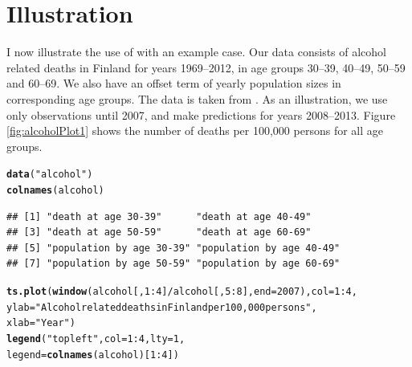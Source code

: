 \documentclass[nojss,article]{jss}\usepackage[]{graphicx}\usepackage[]{color}
\makeatletter
\newcommand{\hlnum}[1]{\textcolor[rgb]{0.686,0.059,0.569}{#1}}%
\newcommand{\hlstr}[1]{\textcolor[rgb]{0.192,0.494,0.8}{#1}}%
\newcommand{\hlopt}[1]{\textcolor[rgb]{0,0,0}{#1}}%
\newcommand{\hlstd}[1]{\textcolor[rgb]{0.345,0.345,0.345}{#1}}%
\newcommand{\hlkwc}[1]{\textcolor[rgb]{0.333,0.667,0.333}{#1}}%
\newcommand{\hlkwd}[1]{\textcolor[rgb]{0.737,0.353,0.396}{\textbf{#1}}}%
\newenvironment{kframe}{%
 \def\at@end@of@kframe{}%
 \ifinner\ifhmode%
  \def\at@end@of@kframe{\end{minipage}}%
  \begin{minipage}{\columnwidth}%
 \fi\fi%
 \def\FrameCommand##1{\hskip\@totalleftmargin \hskip-\fboxsep
 \colorbox{shadecolor}{##1}\hskip-\fboxsep
     \hskip-\linewidth \hskip-\@totalleftmargin \hskip\columnwidth}%
 \MakeFramed {\advance\hsize-\width
   \@totalleftmargin\z@ \linewidth\hsize
   \@setminipage}}%
 {\par\unskip\endMakeFramed%
 \at@end@of@kframe}
\newenvironment{knitrout}{}{} %
\makeatother
\begin{document}
\section{Illustration}\label{illustration}

I now illustrate the use of  with an example case. Our data consists of alcohol related deaths in Finland for years 1969--2012, in age groups 30--39, 40--49, 50--59 and 60--69. We also have an offset term of yearly population sizes in corresponding age groups. The data is taken from \citet{stat1, stat2}. As an illustration, we use only observations until 2007, and make predictions for years 2008--2013. Figure \ref{fig:alcoholPlot1} shows the number of deaths per 100,000 persons for all age groups.

\begin{knitrout}
\color{fgcolor}\begin{kframe}
\begin{alltt}
\hlkwd{data}\hlstd{(}\hlstr{"alcohol"}\hlstd{)}
\hlkwd{colnames}\hlstd{(alcohol)}
\end{alltt}
\begin{verbatim}
## [1] "death at age 30-39"      "death at age 40-49"     
## [3] "death at age 50-59"      "death at age 60-69"     
## [5] "population by age 30-39" "population by age 40-49"
## [7] "population by age 50-59" "population by age 60-69"
\end{verbatim}
\begin{alltt}
\hlkwd{ts.plot}\hlstd{(}\hlkwd{window}\hlstd{(alcohol[,}\hlnum{1}\hlopt{:}\hlnum{4}\hlstd{]}\hlopt{/}\hlstd{alcohol[,}\hlnum{5}\hlopt{:}\hlnum{8}\hlstd{],} \hlkwc{end} \hlstd{=} \hlnum{2007}\hlstd{),} \hlkwc{col} \hlstd{=} \hlnum{1}\hlopt{:}\hlnum{4}\hlstd{,}
        \hlkwc{ylab} \hlstd{=} \hlstr{"Alcohol related deaths in Finland per 100,000 persons"}\hlstd{,}
        \hlkwc{xlab} \hlstd{=} \hlstr{"Year"}\hlstd{)}
\hlkwd{legend}\hlstd{(}\hlstr{"topleft"}\hlstd{,}\hlkwc{col} \hlstd{=} \hlnum{1}\hlopt{:}\hlnum{4}\hlstd{,} \hlkwc{lty} \hlstd{=} \hlnum{1}\hlstd{,}
       \hlkwc{legend} \hlstd{=} \hlkwd{colnames}\hlstd{(alcohol)[}\hlnum{1}\hlopt{:}\hlnum{4}\hlstd{])}
\end{alltt}
\end{kframe}\begin{figure}[!ht]


\end{figure}
\end{knitrout}
\end{document}
